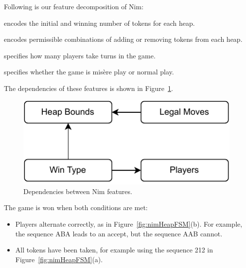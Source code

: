 \documentclass[conference]{IEEEtran}
\begin{document}
Following is our feature decomposition of Nim:
\begin{description}
    \item[Heap Bounds] encodes the initial and winning number of tokens for each heap.
    \item[Legal Moves] encodes permissible combinations of adding or removing tokens from each heap.
    \item[Num Players] specifies how many players take turns in the game.
    \item[Win Type] specifies whether the game is mis\`{e}re play or normal play.
\end{description}
The dependencies of these features is shown in Figure~\ref{fig:nimDependencies}.  

\begin{figure}
    \centering
    \includegraphics[width=0.4\linewidth]{figures/NimFeatures.pdf}
    \caption{Dependencies between Nim features.}
    \label{fig:nimDependencies}
\end{figure}


The game is won when both conditions are met:
\begin{itemize}
    \item Players alternate correctly, as in Figure~\ref{fig:nimHeapFSM}(b).  For example, the sequence ABA leads to an accept, but the sequence AAB cannot.
    \item All tokens have been taken, for example using the sequence 212 in Figure~\ref{fig:nimHeapFSM}(a).
\end{itemize}
\end{document}
